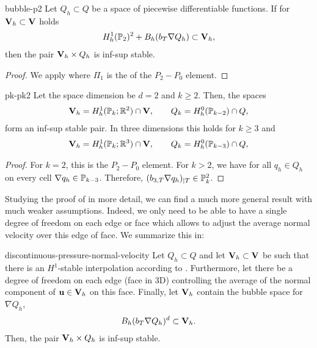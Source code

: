 \begin{Corollary}{bubble-p2}
  Let $Q_h\subset Q$ be a space of piecewise differentiable
  functions. If for $\vV_h\subset \vV$ holds
  \begin{gather}
    H^1_h(\P_2)^2 + B_h(b_\cell \nabla Q_h) \subset \vV_h,
  \end{gather}
  then the pair $\vV_h\times Q_h$ is inf-sup stable.
\end{Corollary}

\begin{proof}
  We apply  where $\Pi_1$ is the  of the $P_2-P_0$ element.
\end{proof}

\begin{Corollary}{pk-pk2}
  Let the space dimension be $d=2$ and $k\ge 2$. Then, the spaces
  \begin{gather}
    \vV_h = H^1_h(\P_k;\R^2) \cap \vV,
    \qquad
    Q_k = H^0_h(\P_{k-2}) \cap Q,
  \end{gather}
  form an inf-sup stable pair.
  In three dimensions this holds for $k\ge 3$ and
  \begin{gather}
    \vV_h = H^1_h(\P_k;\R^3) \cap \vV,
    \qquad
    Q_k = H^0_h(\P_{k-3}) \cap Q,
  \end{gather}
\end{Corollary}

\begin{proof}
  For $k=2$, this is the $P_2-P_0$ element. For $k>2$, we have for all
  $q_h\in Q_h$ on every cell $\nabla q_h\in \P_{k-3}$. Therefore,
  $(b_{3,\cell} \nabla q_h)_{|\cell} \in \P_k^2$.
\end{proof}

\begin{intro}
  Studying the proof of  in more
  detail, we can find a much more general result with much weaker
  assumptions. Indeed, we only need to be able to have a single degree
  of freedom on each edge or face which allows to adjust the average
  normal velocity over this edge of face. We summarize this in:
\end{intro}

\begin{Theorem}{discontinuous-pressure-normal-velocity}
  Let $Q_h\subset Q$ and let $\vV_h \subset \vV$ be such that there is an
  $H^1$-stable interpolation according to
  . Furthermore, let
  there be a degree of freedom on each edge (face in 3D) controlling
  the average of the normal component of $\vu\in \vV_h$ on this face. Finally,
  let $\vV_h$ contain the bubble space for $\nabla Q_h$,
  \begin{gather}
    B_h(b_\cell \nabla Q_h)^d \subset \vV_h.
  \end{gather}
  Then, the pair $\vV_h\times Q_h$ is inf-sup stable.
\end{Theorem}

